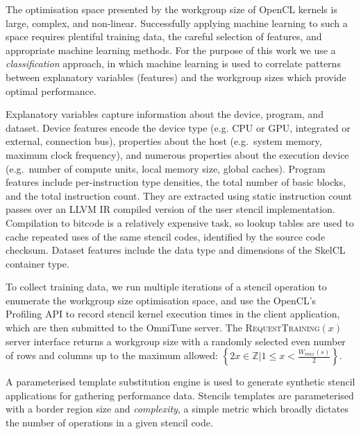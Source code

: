 \documentclass[nonatbib,preprint,9pt]{sigplanconf}
\begin{document}
The optimisation space presented by the workgroup size of OpenCL
kernels is large, complex, and non-linear. Successfully applying
machine learning to such a space requires plentiful training data, the
careful selection of features, and appropriate machine learning
methods. For the purpose of this work we use a \emph{classification}
approach, in which machine learning is used to correlate patterns
between explanatory variables (features) and the workgroup sizes which
provide optimal performance.

Explanatory variables capture information about the device, program,
and dataset. Device features encode the device type (e.g. CPU or GPU,
integrated or external, connection bus), properties about the host
(e.g.\ system memory, maximum clock frequency), and numerous
properties about the execution device (e.g.\ number of compute units,
local memory size, global caches). Program features include
per-instruction type densities, the total number of basic blocks, and
the total instruction count. They are extracted using static
instruction count passes over an LLVM IR compiled version of the user
stencil implementation. Compilation to bitcode is a relatively
expensive task, so lookup tables are used to cache repeated uses of
the same stencil codes, identified by the source code
checksum. Dataset features include the data type and dimensions of the
SkelCL container type.


To collect training data, we run multiple iterations of a stencil
operation to enumerate the workgroup size optimisation space, and use
the OpenCL's Profiling API to record stencil kernel execution times in
the client application, which are then submitted to the OmniTune
server. The \textsc{RequestTraining}$(x)$ server interface returns a
workgroup size with a randomly selected even number of rows and
columns up to the maximum allowed:
$\left\{ 2x \in \mathbb{Z} | 1 \le x < \frac{W_{max}(s)}{2} \right\}$.

A parameterised template substitution engine is used to generate
synthetic stencil applications for gathering performance
data. Stencils templates are parameterised with a border region size
and \emph{complexity}, a simple metric which broadly dictates the
number of operations in a given stencil code.

\end{document}
